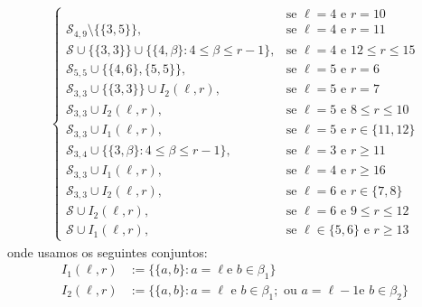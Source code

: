 \documentclass[12pt,a4paper]{book}
\begin{document}
\begin{equation*}
\begin{aligned}
\begin{cases}
        & \text{se } \ell=4 \text{ e } r=10      \\ 
         \mathcal{S}_{4,9} \setminus\{\{3,5\}\}, 
        & \text{se } \ell=4 \text{ e } r=11      \\ 
         \mathcal{S} \cup \{\{3,3\}\} \cup \{\{4,\beta\}: 4\leq \beta\leq r-1\}, 
        & \text{se } \ell=4 \text{ e } 12\leq r\leq 15     \\ 
         \mathcal{S}_{5,5} \cup \{\{4,6\}, \{5,5\}\}, 
        & \text{se } \ell=5 \text{ e } r=6     \\
         \mathcal{S}_{3,3} \cup \{\{3,3\}\}\cup I_2(\ell,r), 
        & \text{se } \ell=5 \text{ e } r=7    \\
         \mathcal{S}_{3,3} \cup I_2(\ell,r), 
        & \text{se } \ell=5 \text{ e } 8\leq r\leq 10    \\
         \mathcal{S}_{3,3} \cup I_1(\ell,r), 
        & \text{se } \ell=5 \text{ e } r\in \{11,12\}    \\
        \mathcal{S}_{3,4} \cup \{\{3,\beta\}: 4 \leq \beta \leq r-1\}, & \text{se } \ell =3 \text{ e } r \geq 11 \\
        \mathcal{S}_{3,3} \cup I_1(\ell,r),  & \text{se } \ell =4 \text{ e } r \geq 16  \\
         \mathcal{S}_{3,3} \cup I_2(\ell,r),  & \text{se } \ell=6 \text{ e } r \in\{7,8\}  \\
        \mathcal{S} \cup I_2(\ell,r),  & \text{se } \ell=6 \text{ e }  9\leq r \leq 12 \\
        \mathcal{S} \cup I_1(\ell,r),  & \text{se } \ell \in\{5,6\} \text{ e } r \geq 13         
        \end{cases}
    \end{aligned}  
\end{equation*}
onde usamos os seguintes conjuntos:
\begin{equation*}
    \begin{aligned}
        I_1(\ell,r) &:= \{\{a,b\}: a=\ell\text{
    e }b\in \beta_1\}
        \\
        I_2(\ell,r) &:= \{\{a,b\}: a=\ell\text{ e }b\in \beta_1;\text{ ou }a=\ell-1\text{
    e }b\in \beta_2\}
    \end{aligned}
\end{equation*}

\backmatter \singlespacing   %
\end{document}
